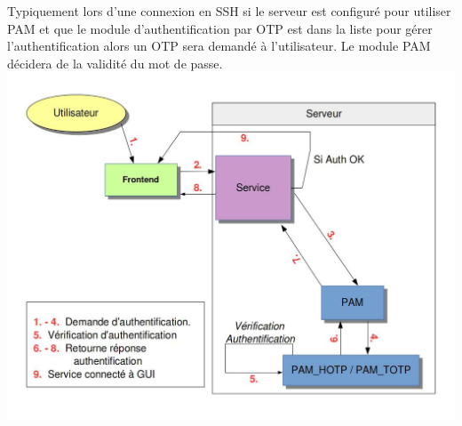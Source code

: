 \documentclass{"../../res/univ-projet"}
\begin{document}
Typiquement lors d'une connexion en SSH si le serveur est configuré pour utiliser PAM et que le module
d'authentification par OTP est dans la liste pour gérer l'authentification alors un OTP sera demandé
à l'utilisateur. Le module PAM décidera de la validité du mot de passe.
\newline
\includegraphics[width=\textwidth]{../graphics/authentification.jpg}
\end{document}
